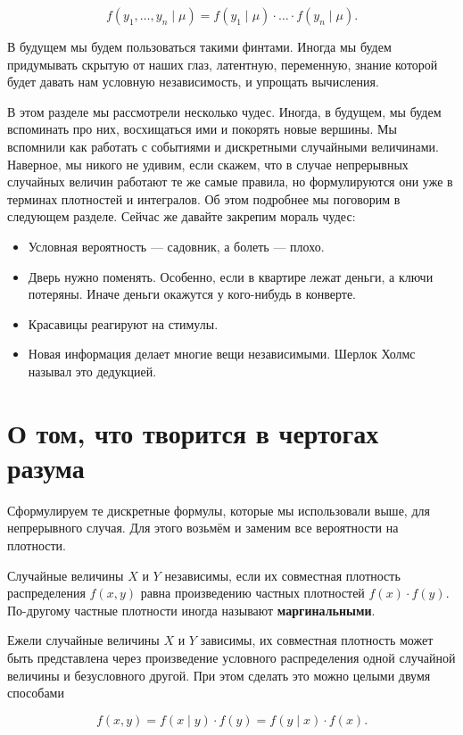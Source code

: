 \documentclass[12pt, a4paper, oneside]{extreport}
\newcommand{\indef}[1]{\textbf{#1}}     %
\theoremstyle{plain}              %
\theoremstyle{definition}         %
\begin{document}
 \[ f(y_1, \ldots, y_n \mid \mu) = f(y_1 \mid \mu) \cdot \ldots \cdot f(y_n \mid \mu). \] 

В будущем мы будем пользоваться такими финтами. Иногда мы будем придумывать скрытую от наших глаз, латентную, переменную, знание которой будет давать нам условную независимость, и упрощать вычисления.

В этом разделе мы рассмотрели несколько чудес. Иногда, в будущем, мы будем вспоминать про них, восхищаться ими и покорять новые вершины. Мы вспомнили как работать с событиями и дискретными случайными величинами. Наверное, мы никого не удивим, если скажем, что в случае непрерывных случайных величин работают те же самые правила, но формулируются они уже в терминах плотностей и интегралов.  Об этом подробнее мы поговорим в следующем разделе. Сейчас же давайте закрепим мораль чудес: 

\begin{itemize}
	\item  Условная вероятность --- садовник, а болеть --- плохо.
	\item  Дверь нужно поменять. Особенно, если в квартире лежат деньги, а ключи потеряны. Иначе деньги окажутся у кого-нибудь в конверте.
	\item  Красавицы реагируют на стимулы.
	\item  Новая информация делает многие вещи независимыми. Шерлок Холмс называл это дедукцией. 
\end{itemize}

\section{О том, что творится в чертогах разума}

Сформулируем те дискретные формулы, которые мы использовали выше, для непрерывного случая. Для этого возьмём и заменим все вероятности на плотности.

Случайные величины $X$ и $Y$ независимы, если их совместная плотность распределения $f(x,y)$ равна произведению частных плотностей $f(x) \cdot f(y)$. По-другому частные плотности иногда называют \indef{маргинальными}.

Ежели случайные величины $X$ и $Y$ зависимы, их совместная плотность может быть представлена через произведение условного распределения одной случайной величины и безусловного другой. При этом сделать это можно целыми двумя способами

\begin{equation}\label{f1}
 f(x,y) = f(x \mid y) \cdot f(y) = f(y \mid x) \cdot f(x).
\end{equation}
\end{document}
